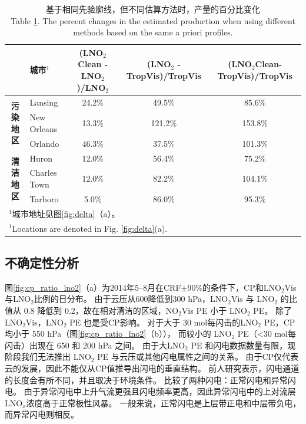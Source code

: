 \begin{table}[h]
\scriptsize
\caption{基于相同先验廓线，但不同估算方法时，产量的百分比变化\\Table \ref{table:production_comp}. The percent changes in the estimated production when using different methods based on the same a priori profiles.}
\begin{tabular}{clccc}
\hline
\textbf{} & \textbf{城市$^1$} & \textbf{(LNO$_\textrm{2}$Clean - LNO$_\textrm{2}$)/LNO$_\textrm{2}$} & \textbf{(LNO$_\textrm{2}$ - TropVis)/TropVis} & \textbf{(LNO$_\textrm{2}$Clean-TropVis)/TropVis} \\
\hline
\multirow{3}{*}{\textbf{污染地区}} & Lansing          & 24.2\%  & 49.5\%   & 85.6\%   \\
                                   & New Orleans      & 13.3\%  & 121.2\%  & 153.8\%  \\
                                   & Orlando          & 46.3\%  & 37.5\%   & 101.3\%  \\
\hline
\multirow{3}{*}{\textbf{清洁地区}}    & Huron            & 12.0\%  & 56.4\%   & 75.2\%   \\
                                   & Charles Town     & 12.0\%  & 82.2\%   & 104.1\%  \\
                                   & Tarboro          & 5.0\%   & 86.0\%   & 95.3\%   \\
\hline
\multicolumn{5}{l}{$^1$城市地址见图\ref{fig:delta}（a）。}\\
\multicolumn{5}{l}{$^1$Locations are denoted in Fig. \ref{fig:delta}(a).}
\end{tabular}
\label{table:production_comp}
\end{table}

\subsection{不确定性分析} \label{susbec:china_uncertainty}

图\ref{fig:cp_ratio_lno2}（a）为2014年5--8月在CRF$\pm$90\%的条件下，CP和LNO$_2$Vis与LNO$_2$比例的日分布。
由于云压从600降低到300 hPa，LNO$_2$Vis 与 LNO$_2$ 的比值从 0.8 降低到 0.2，故在相对清洁的区域，NO$_2$Vis PE 小于 LNO$_2$ PE。
除了 LNO$_2$Vis，LNO$_2$ PE 也是受CP影响。
对于大于 30 mol每闪击的LNO$_2$ PE，CP 均小于 550 hPa（图\ref{fig:cp_ratio_lno2}（b）），
而较小的 LNO$_2$ PE（<30 mol每闪击）出现在 650 和 200 hPa 之间。
由于大LNO$_2$ PE 和闪电数据数量有限，现阶段我们无法推出 LNO$_2$ PE 与云压或其他闪电属性之间的关系。
由于CP仅代表云的发展，因此不能仅从CP值推导出闪电的垂直结构。
前人研究表示，闪电通道的长度会有所不同，并且取决于环境条件\citep{Carey.2016,Mecikalski.2017,Fuchs.2018}。
\citet{Davis.2019}比较了两种闪电：正常闪电和异常闪电。
由于异常闪电中上升气流更强且闪电频率更高，因此异常闪电中的上对流层LNO$_x$浓度高于正常极性风暴。
一般来说，正常闪电是上层带正电和中层带负电，而异常闪电则相反\citep{Williams.1989}。

